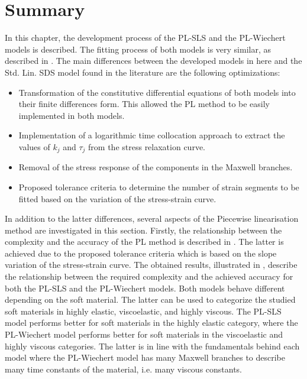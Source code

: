 \section{Summary}

In this chapter, the development process of the PL-SLS and the PL-Wiechert models is described. The fitting process of both models is very similar, as described in . The main differences between the developed models in here and the Std. Lin. SDS model found in the literature \cite{austin2015control} are the following optimizations: 

\begin{itemize}
	\item Transformation of the constitutive differential equations of both models into their finite differences form. This allowed the PL method to be easily implemented in both models.
	\item Implementation of a logarithmic time collocation approach to extract the values of $k_j$ and $\tau_j$ from the stress relaxation curve.
	\item Removal of the stress response of the components in the Maxwell branches.
	\item Proposed tolerance criteria to determine the number of strain segments to be fitted based on the variation of the stress-strain curve.
\end{itemize}

In addition to the latter differences, several aspects of the Piecewise linearisation method are investigated in this section. Firstly, the relationship between the complexity and the accuracy of the PL method is described in . The latter is achieved due to the proposed tolerance criteria which is based on the slope variation of the stress-strain curve. The obtained results, illustrated in , describe the relationship between the required complexity and the achieved accuracy for both the PL-SLS and the PL-Wiechert models. Both models behave different depending on the soft material. The latter can be used to categorize the studied soft materials in highly elastic, viscoelastic, and highly viscous. The PL-SLS model performs better for soft materials in the highly elastic category, where the PL-Wiechert model performs better for soft materials in the viscoelastic and highly viscous categories. The latter is in line with the fundamentals behind each model where the PL-Wiechert model has many Maxwell branches to describe many time constants of the material, i.e. many viscous constants. 

